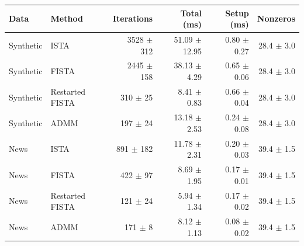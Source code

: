 \begin{tabular}{llrrrr}
\toprule
Data & Method & Iterations & Total (ms) & Setup (ms) & Nonzeros \\
\midrule
Synthetic & ISTA & 3528 $\pm$ 312 & 51.09 $\pm$ 12.95 & 0.80 $\pm$ 0.27 & 28.4 $\pm$ 3.0 \\
Synthetic & FISTA & 2445 $\pm$ 158 & 38.13 $\pm$ 4.29 & 0.65 $\pm$ 0.06 & 28.4 $\pm$ 3.0 \\
Synthetic & Restarted FISTA & 310 $\pm$ 25 & 8.41 $\pm$ 0.83 & 0.66 $\pm$ 0.04 & 28.4 $\pm$ 3.0 \\
Synthetic & ADMM & 197 $\pm$ 24 & 13.18 $\pm$ 2.53 & 0.24 $\pm$ 0.08 & 28.4 $\pm$ 3.0 \\
News & ISTA & 891 $\pm$ 182 & 11.78 $\pm$ 2.31 & 0.20 $\pm$ 0.03 & 39.4 $\pm$ 1.5 \\
News & FISTA & 422 $\pm$ 97 & 8.69 $\pm$ 1.95 & 0.17 $\pm$ 0.01 & 39.4 $\pm$ 1.5 \\
News & Restarted FISTA & 121 $\pm$ 24 & 5.94 $\pm$ 1.34 & 0.17 $\pm$ 0.02 & 39.4 $\pm$ 1.5 \\
News & ADMM & 171 $\pm$ 8 & 8.12 $\pm$ 1.13 & 0.08 $\pm$ 0.02 & 39.4 $\pm$ 1.5 \\
\bottomrule
\end{tabular}
